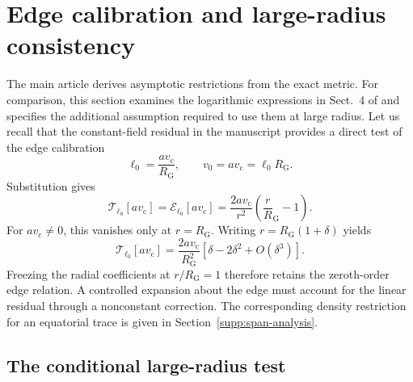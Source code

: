 \documentclass[11pt,a4paper]{article}
\numberwithin{equation}{section}
\theoremstyle{plain}
\theoremstyle{definition}
\theoremstyle{remark}
\newcommand{\ellzero}{\ell_0}
\newcommand{\RG}{R_{\mathrm G}}
\newcommand{\vc}{v_{\mathrm c}}
\newcommand{\ET}{\mathcal T_{\ellzero}}
\newcommand{\EE}{\mathcal E_{\ellzero}}
\begin{document}
\section{Edge calibration and large-radius consistency}
\label{supp:retained-asymptotics}

The main article derives asymptotic restrictions from the exact metric.
For comparison, this section examines the logarithmic expressions in
Sect.~4 of \cite{Astesiano2022EPJC} and specifies the additional assumption required to use them at large radius. Let us recall that the constant-field residual in the manuscript provides a direct test of the edge calibration
\begin{equation}\label{eq:paper-choice}
\ellzero=\frac{a\vc}{\RG},\qquad v_0=a\vc=\ellzero\RG.
\end{equation}
Substitution gives
\begin{equation}\label{eq:paper-residual}
\ET[a\vc]=\EE[a\vc]=\frac{2a\vc}{r^2}\left(\frac r\RG-1\right).
\end{equation}
For $a\vc\neq 0$, this vanishes only at $r=\RG$. Writing $r=\RG(1+\delta)$ yields
\begin{equation}\label{eq:delta-residual}
\ET[a\vc]=\frac{2a\vc}{\RG^2}
\left[\delta-2\delta^2+O(\delta^3)\right].
\end{equation}
Freezing the radial coefficients at $r/\RG=1$ therefore retains the zeroth-order edge relation. A controlled expansion about the edge must account for the linear residual through a nonconstant correction. The corresponding density restriction for an equatorial trace is given in Section~\ref{supp:span-analysis}.

\subsection{The conditional large-radius test}
\end{document}
